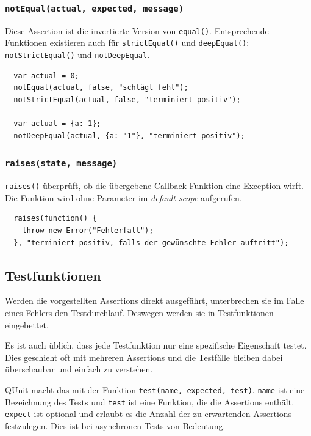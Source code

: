 \documentclass[11pt, a4paper]{article}
\begin{document}
\subsubsection*{\texttt{notEqual(actual, expected, message)}}

Diese Assertion ist die invertierte Version von \texttt{equal()}.
Entsprechende Funktionen existieren auch für \texttt{strictEqual()} und
\texttt{deepEqual()}: \texttt{notStrictEqual()} und \texttt{notDeepEqual}.

\begin{verbatim}
  var actual = 0;
  notEqual(actual, false, "schlägt fehl");
  notStrictEqual(actual, false, "terminiert positiv");

  var actual = {a: 1};
  notDeepEqual(actual, {a: "1"}, "terminiert positiv");
\end{verbatim}

\subsubsection*{\texttt{raises(state, message)}}

\texttt{raises()} überprüft, ob die übergebene Callback Funktion eine Exception
wirft. Die Funktion wird ohne Parameter im \emph{default scope} aufgerufen.

\begin{verbatim}
  raises(function() {
    throw new Error("Fehlerfall");
  }, "terminiert positiv, falls der gewünschte Fehler auftritt");
\end{verbatim}

\subsection{Testfunktionen}

Werden die vorgestellten Assertions direkt ausgeführt, unterbrechen sie
im Falle eines Fehlers den Testdurchlauf. Deswegen werden sie in Testfunktionen
eingebettet.

Es ist auch üblich, dass jede Testfunktion nur eine spezifische Eigenschaft
testet. Dies geschieht oft mit mehreren Assertions und die Testfälle
bleiben dabei überschaubar und einfach zu verstehen.

QUnit macht das mit der Funktion \texttt{test(name, expected, test)}.
\texttt{name} ist eine Bezeichnung des Tests und \texttt{test} ist eine
Funktion, die die Assertions enthält. \texttt{expect} ist optional und
erlaubt es die Anzahl der zu erwartenden Assertions festzulegen. Dies ist
bei asynchronen Tests von Bedeutung.
\end{document}
